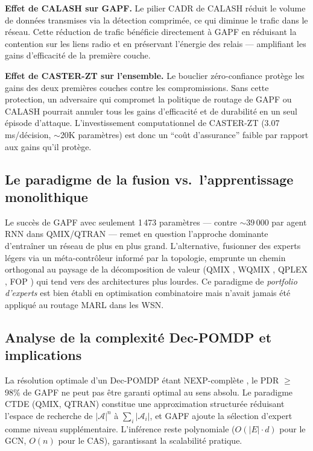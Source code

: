 \textbf{Effet de CALASH sur GAPF.} Le pilier CADR de CALASH réduit le volume de données transmises via la détection comprimée, ce qui diminue le trafic dans le réseau. Cette réduction de trafic bénéficie directement à GAPF en réduisant la contention sur les liens radio et en préservant l'énergie des relais --- amplifiant les gains d'efficacité de la première couche.

\textbf{Effet de CASTER-ZT sur l'ensemble.} Le bouclier zéro-confiance protège les gains des deux premières couches contre les compromissions. Sans cette protection, un adversaire qui compromet la politique de routage de GAPF ou CALASH pourrait annuler tous les gains d'efficacité et de durabilité en un seul épisode d'attaque. L'investissement computationnel de CASTER-ZT (3.07\,ms/décision, $\sim$20K paramètres) est donc un ``coût d'assurance'' faible par rapport aux gains qu'il protège.

\subsection{Le paradigme de la fusion vs.\ l'apprentissage monolithique}

Le succès de GAPF avec seulement 1\,473 paramètres --- contre ${\sim}39\,000$ par agent RNN dans QMIX/QTRAN --- remet en question l'approche dominante d'entraîner un réseau de plus en plus grand. L'alternative, fusionner des experts légers via un méta-contrôleur informé par la topologie, emprunte un chemin orthogonal au paysage de la décomposition de valeur (QMIX \cite{rashid2018qmix}, WQMIX \cite{Rashid2020WQMIX}, QPLEX \cite{Wang2021QPLEX}, FOP \cite{Zhang2021FOP}) qui tend vers des architectures plus lourdes. Ce paradigme de \emph{portfolio d'experts} est bien établi en optimisation combinatoire mais n'avait jamais été appliqué au routage MARL dans les WSN.

\subsection{Analyse de la complexité Dec-POMDP et implications}

La résolution optimale d'un Dec-POMDP étant NEXP-complète \cite{Bernstein2002DecPOMDP}, le PDR $\geq$ 98\% de GAPF ne peut pas être garanti optimal au sens absolu. Le paradigme CTDE (QMIX, QTRAN) constitue une approximation structurée réduisant l'espace de recherche de $|\mathcal{A}|^n$ à $\sum_i |\mathcal{A}_i|$, et GAPF ajoute la sélection d'expert comme niveau supplémentaire. L'inférence reste polynomiale ($O(|E| \cdot d)$ pour le GCN, $O(n)$ pour le CAS), garantissant la scalabilité pratique.

